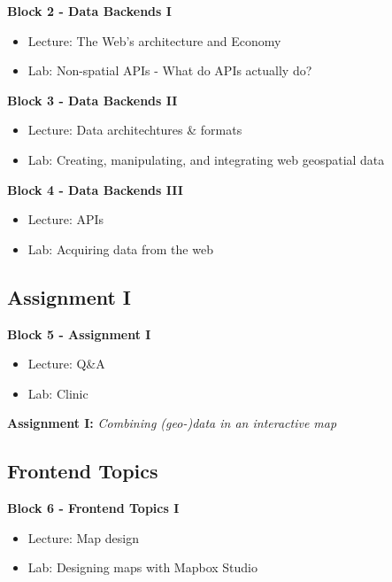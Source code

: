 \documentclass[
  letterpaper,
  DIV=11,
  numbers=noendperiod]{scrreprt}
\begin{document}
\textbf{Block 2 - Data Backends I}

\begin{itemize}
\item
  Lecture: The Web's architecture and Economy
\item
  Lab: Non-spatial APIs - What do APIs actually do?
\end{itemize}

\textbf{Block 3 - Data Backends II}

\begin{itemize}
\item
  Lecture: Data architechtures \& formats
\item
  Lab: Creating, manipulating, and integrating web geospatial data
\end{itemize}

\textbf{Block 4 - Data Backends III}

\begin{itemize}
\item
  Lecture: APIs
\item
  Lab: Acquiring data from the web
\end{itemize}

\hypertarget{assignment-i}{%
\subsection*{Assignment I}\label{assignment-i}}

\textbf{Block 5 - Assignment I}

\begin{itemize}
\item
  Lecture: Q\&A
\item
  Lab: Clinic
\end{itemize}

\textbf{Assignment I:} \emph{Combining (geo-)data in an interactive map}

\hypertarget{frontend-topics}{%
\subsection*{Frontend Topics}\label{frontend-topics}}

\textbf{Block 6 - Frontend Topics I}

\begin{itemize}
\item
  Lecture: Map design
\item
  Lab: Designing maps with Mapbox Studio
\end{itemize}
\end{document}
